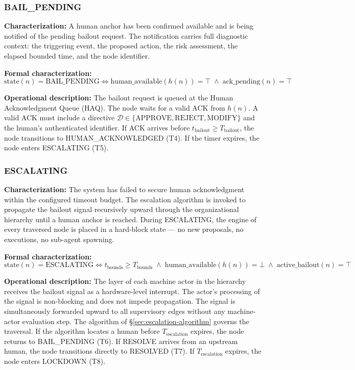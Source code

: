 \subsubsection{BAIL\_PENDING}

\textbf{Characterization:} A human anchor has been confirmed available and is being notified of the pending bailout request. The notification carries full diagnostic context: the triggering event, the proposed action, the risk assessment, the elapsed bounded time, and the node identifier.

\textbf{Formal characterization:}
\[
\text{state}(n) = \text{BAIL\_PENDING} \iff
\text{human\_available}(h(n)) = \top \;\land\;
\text{ack\_pending}(n) = \top
\]

\textbf{Operational description:} The bailout request is queued at the Human Acknowledgment Queue (HAQ). The node waits for a valid ACK from $h(n)$. A valid ACK must include a directive $\mathcal{D} \in \{\text{APPROVE}, \text{REJECT}, \text{MODIFY}\}$ and the human's authenticated identifier. If ACK arrives before $t_{\text{bailout}} \geq T_{\text{bailout}}$, the node transitions to HUMAN\_ACKNOWLEDGED (T4). If the timer expires, the node enters ESCALATING (T5).

\subsubsection{ESCALATING}

\textbf{Characterization:} The system has failed to secure human acknowledgment within the configured timeout budget. The escalation algorithm is invoked to propagate the bailout signal recursively upward through the organizational hierarchy until a human anchor is reached. During ESCALATING, the \bounds{} engine of every traversed node is placed in a hard-block state — no new proposals, no executions, no sub-agent spawning.

\textbf{Formal characterization:}
\[
\text{state}(n) = \text{ESCALATING} \iff
t_{\text{bounds}} \geq T_{\text{bounds}} \;\land\;
\text{human\_available}(h(n)) = \bot \;\land\;
\text{active\_bailout}(n) = \top
\]

\textbf{Operational description:} The \fact{} layer of each machine actor in the hierarchy receives the bailout signal as a hardware-level interrupt. The actor's processing of the signal is non-blocking and does not impede propagation. The signal is simultaneously forwarded upward to all supervisory edges without any machine-actor evaluation step. The algorithm of \S\ref{sec:escalation-algorithm} governs the traversal. If the algorithm locates a human before $T_{\text{escalation}}$ expires, the node returns to BAIL\_PENDING (T6). If RESOLVE arrives from an upstream human, the node transitions directly to RESOLVED (T7). If $T_{\text{escalation}}$ expires, the node enters LOCKDOWN (T8).


